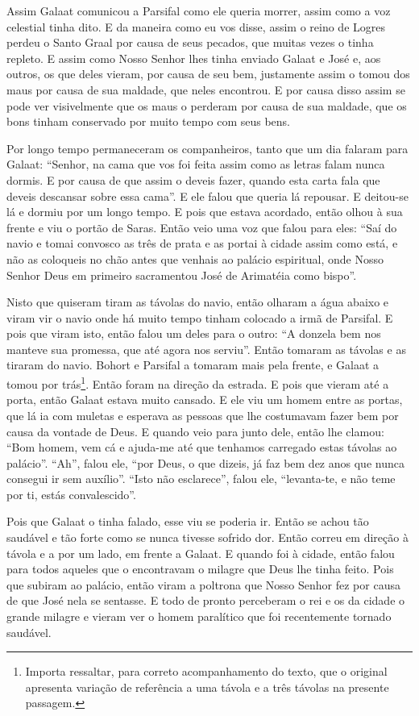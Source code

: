 Assim Galaat comunicou a Parsifal como ele queria morrer, assim como a voz
celestial tinha dito. E da maneira como eu vos disse, assim o reino de Logres
perdeu o Santo Graal por causa de seus pecados, que muitas vezes o tinha
repleto. E assim como Nosso Senhor lhes tinha enviado Galaat e
José e, aos outros, os que deles vieram, por causa de seu bem, justamente assim
o tomou dos maus por causa de sua maldade, que neles encontrou. E por causa
disso assim se pode ver visivelmente que os maus o perderam por causa de sua
maldade, que os bons tinham conservado por muito tempo com seus bens. 

Por longo tempo permaneceram os companheiros, tanto que um dia falaram para
Galaat: “Senhor, na cama que vos foi feita assim como as letras falam nunca
dormis. E por causa de que assim o deveis fazer, quando esta carta fala que
deveis descansar sobre essa cama”. E ele falou que queria lá repousar. E
deitou-se lá e dormiu por um longo tempo. E pois que estava acordado, então
olhou à sua frente e viu o portão de Saras. Então veio uma voz que falou para
eles: “Saí do navio e tomai convosco as três de prata e as portai à cidade
assim como está, e não as coloqueis no chão antes que venhais ao palácio
espiritual, onde Nosso Senhor Deus em primeiro sacramentou José de Arimatéia
como bispo”. 

Nisto que quiseram tiram as távolas do navio, então olharam a água abaixo e
viram vir o navio onde há muito tempo tinham colocado a irmã de Parsifal. E
pois que viram isto, então falou um deles para o outro: “A donzela bem nos
manteve sua promessa, que até agora nos serviu”. Então tomaram as
távolas e as tiraram do navio. Bohort e Parsifal a tomaram mais pela frente, e
Galaat a tomou por trás\footnote{ Importa ressaltar, para correto
acompanhamento do texto, que o original apresenta variação de referência a uma
távola e a três távolas na presente passagem.}. Então foram na
direção da estrada. E pois que vieram até a porta, então Galaat estava muito
cansado. E ele viu um homem entre as portas, que lá ia com muletas e esperava
as pessoas que lhe costumavam fazer bem por causa da vontade de Deus. E quando
veio para junto dele, então lhe clamou: “Bom homem, vem cá e ajuda-me até que
tenhamos carregado estas távolas ao palácio”. “Ah”, falou ele, “por Deus, o que
dizeis, já faz bem dez anos que nunca consegui ir sem auxílio”. “Isto não
esclarece”, falou ele, “levanta-te, e não teme por ti, estás convalescido”. 

Pois que Galaat o tinha falado, esse viu se poderia ir. Então se achou tão
saudável e tão forte como se nunca tivesse sofrido dor. Então correu em direção
à távola e a por um lado, em frente a Galaat. E quando foi à cidade, então
falou para todos aqueles que o encontravam o milagre que Deus lhe tinha feito.
Pois que subiram ao palácio, então viram a poltrona que Nosso Senhor fez por
causa de que José nela se sentasse. E todo de pronto perceberam o rei
e os da cidade o grande milagre e vieram ver o homem paralítico que foi
recentemente tornado saudável.

